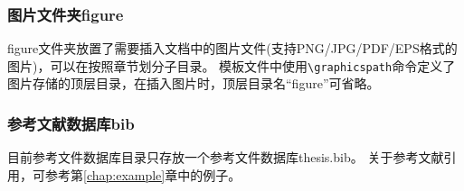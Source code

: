 \subsubsection{图片文件夹figure}
\label{sec:fig}

figure文件夹放置了需要插入文档中的图片文件(支持PNG/JPG/PDF/EPS格式的图片)，可以在按照章节划分子目录。
模板文件中使用\verb|\graphicspath|命令定义了图片存储的顶层目录，在插入图片时，顶层目录名“figure”可省略。

\subsubsection{参考文献数据库bib}
\label{sec:bib}

目前参考文件数据库目录只存放一个参考文件数据库thesis.bib。
关于参考文献引用，可参考第\ref{chap:example}章中的例子。
